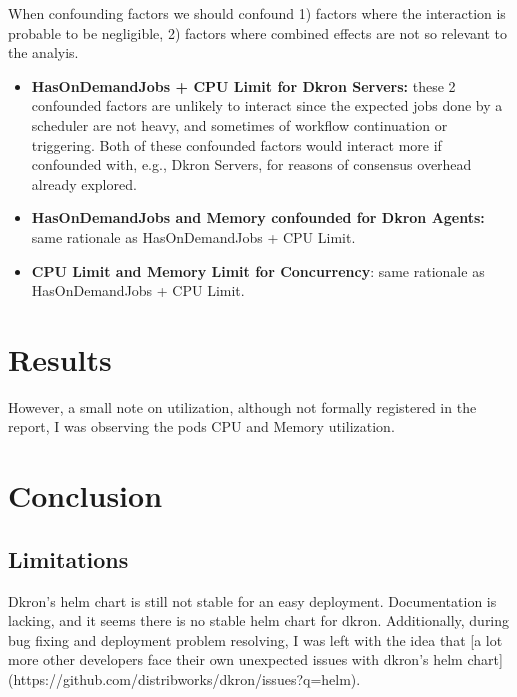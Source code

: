 \documentclass[runningheads]{llncs}
\begin{document}
When confounding factors we should confound 1) factors where the interaction is probable to be negligible,
2) factors where combined effects are not so relevant to the analyis.

\begin{itemize}
    \item \textbf{HasOnDemandJobs + CPU Limit for Dkron Servers:} these 2 confounded factors are unlikely to interact since the expected jobs done by
        a scheduler are not heavy, and sometimes of workflow continuation or triggering.
        Both of these confounded factors would interact more if confounded with, e.g., Dkron Servers,
        for reasons of consensus overhead already explored.
    \item \textbf{HasOnDemandJobs and Memory confounded for Dkron Agents:} same rationale as
    HasOnDemandJobs + CPU Limit.
    \item \textbf{CPU Limit and Memory Limit for Concurrency}: same rationale as HasOnDemandJobs
    + CPU Limit.
\end{itemize}



\section{Results}
\label{results}


However,
a small note on utilization, although not formally registered in the report, I was observing the
pods CPU and Memory utilization.

\section{Conclusion}
\label{conclusion}

\subsection{Limitations}
Dkron's helm chart is still not stable for an easy deployment. Documentation is lacking, and
it seems there is no stable helm chart for dkron. Additionally, during bug fixing and deployment
problem resolving, I was left with the idea that [a lot more other developers face their own
unexpected issues with dkron's helm chart](https://github.com/distribworks/dkron/issues?q=helm).


\end{document}

